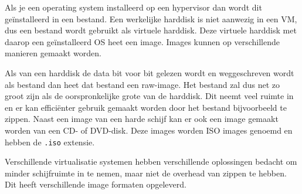 Als je een operating system installeerd op een hypervisor dan wordt dit ge\"installeerd in een bestand. Een werkelijke harddisk is niet aanwezig in een VM, dus een bestand wordt gebruikt als virtuele harddisk. Deze virtuele harddisk met daarop een ge\"installeerd OS heet een image. Images kunnen op verschillende manieren gemaakt worden.

Als van een harddisk de data bit voor bit gelezen wordt en weggeschreven wordt als bestand dan heet dat bestand een raw-image. Het bestand zal dus net zo groot zijn als de oorspronkelijke grote van de harddisk. Dit neemt veel ruimte in en er kan effici\"enter gebruik gemaakt worden door het bestand bijvoorbeeld te zippen. Naast een image van een harde schijf kan er ook een image gemaakt worden van een CD- of DVD-disk. Deze images worden ISO images genoemd en hebben de \texttt{.iso} extensie.

Verschillende virtualisatie systemen hebben verschillende oplossingen bedacht om minder schijfruimte in te nemen, maar niet de overhead van zippen te hebben. Dit heeft verschillende image formaten opgeleverd.
